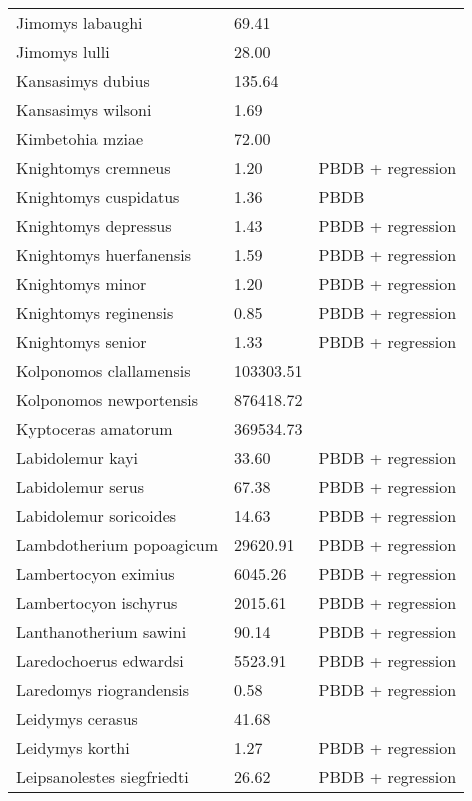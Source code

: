 \documentclass{article}
\begin{document}
\begin{center}
\begin{longtable}{p{} p{} p{}}
    Jimomys labaughi & 69.41 & \cite{Tomiya2013} \\ 
    Jimomys lulli & 28.00 & \cite{McKenna2011} \\ 
    Kansasimys dubius & 135.64 & \cite{Tomiya2013} \\ 
    Kansasimys wilsoni & 1.69 & \cite{Matthew1901} \\ 
    Kimbetohia mziae & 72.00 & \cite{Wilson2012} \\ 
    Knightomys cremneus & 1.20 & PBDB + regression \\ 
    Knightomys cuspidatus & 1.36 & PBDB \\ 
    Knightomys depressus & 1.43 & PBDB + regression \\ 
    Knightomys huerfanensis & 1.59 & PBDB + regression \\ 
    Knightomys minor & 1.20 & PBDB + regression \\ 
    Knightomys reginensis & 0.85 & PBDB + regression \\ 
    Knightomys senior & 1.33 & PBDB + regression \\ 
    Kolponomos clallamensis & 103303.51 & \cite{Tseng2009} \\ 
    Kolponomos newportensis & 876418.72 & \cite{Scott2013} \\ 
    Kyptoceras amatorum & 369534.73 & \cite{Tomiya2013} \\ 
    Labidolemur kayi & 33.60 & PBDB + regression \\ 
    Labidolemur serus & 67.38 & PBDB + regression \\ 
    Labidolemur soricoides & 14.63 & PBDB + regression \\ 
    Lambdotherium popoagicum & 29620.91 & PBDB + regression \\ 
    Lambertocyon eximius & 6045.26 & PBDB + regression \\ 
    Lambertocyon ischyrus & 2015.61 & PBDB + regression \\ 
    Lanthanotherium sawini & 90.14 & PBDB + regression \\ 
    Laredochoerus edwardsi & 5523.91 & PBDB + regression \\ 
    Laredomys riograndensis & 0.58 & PBDB + regression \\ 
    Leidymys cerasus & 41.68 & \cite{Tomiya2013} \\ 
    Leidymys korthi & 1.27 & PBDB + regression \\ 
    Leipsanolestes siegfriedti & 26.62 & PBDB + regression \\ 

\end{longtable}
\end{center}
\end{document}
